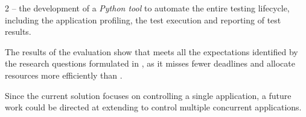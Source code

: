 2 -- the development of a \textit{Python tool} to automate the entire testing lifecycle, including the application profiling, the test execution and reporting of test results. 

The results of the evaluation show that \tool meets all the expectations identified by the research questions formulated in , as it misses fewer deadlines and allocate resources more efficiently than \cSpark. 

 
Since the current solution focuses on controlling a single application, a future work could be directed at extending \tool to control multiple concurrent applications.

